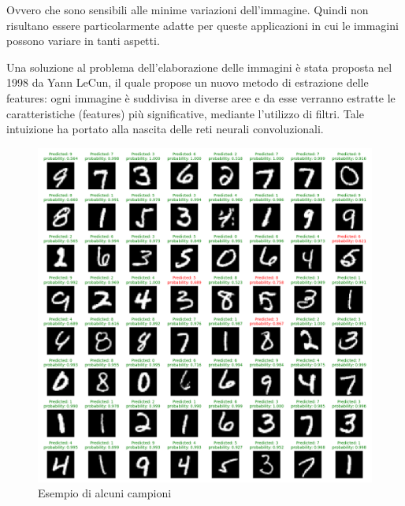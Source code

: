 Ovvero che sono sensibili alle minime variazioni dell'immagine. Quindi non risultano 
essere particolarmente adatte per queste applicazioni in cui le immagini possono 
variare in tanti aspetti.

Una soluzione al problema dell’elaborazione delle immagini è stata proposta nel 1998
da Yann LeCun, il quale propose un nuovo metodo di estrazione delle features:
ogni immagine è suddivisa in diverse aree e da esse verranno estratte le caratteristiche
(features) più significative, mediante l’utilizzo di filtri. Tale intuizione ha portato alla
nascita delle reti neurali convoluzionali.

\begin{figure}[H]
    \centering
    \includegraphics[width=1.0\textwidth]{Immagini/Grafici/esempio_MNIST_processato.png}
    \caption{Esempio di alcuni campioni}
    \label{fig:MNIST_processato}
\end{figure}

